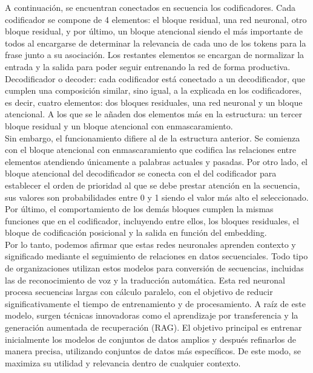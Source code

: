 A continuación, se encuentran conectados en secuencia los codificadores. Cada codificador se compone de 4 elementos: el bloque residual, una red neuronal, otro bloque residual, y por último, un bloque atencional siendo el más importante de todos al encargarse de determinar la relevancia de cada uno de los tokens para la frase junto a su asociación. Los restantes elementos se encargan de normalizar la entrada y la salida para poder seguir entrenando la red de forma productiva. \\

Decodificador o decoder: cada codificador está conectado a un decodificador, que cumplen una composición similar, sino igual,  a  la explicada en los codificadores, es decir, cuatro elementos: dos bloques residuales, una red neuronal y un bloque atencional. A los que se le añaden dos elementos más en la estructura: un tercer bloque residual y un bloque atencional con enmascaramiento. \\

Sin embargo, el funcionamiento difiere al de la estructura anterior. Se comienza con el bloque atencional con enmascaramiento que codifica las relaciones entre elementos atendiendo únicamente a palabras actuales y pasadas. Por otro lado, el bloque atencional del decodificador se conecta con el del codificador para establecer el orden de prioridad al que se debe prestar atención en la secuencia, sus valores son probabilidades entre 0 y 1 siendo el valor más alto el seleccionado. Por último, el comportamiento de los demás bloques cumplen la mismas funciones que en el codificador, incluyendo entre ellos, los bloques residuales, el bloque de codificación posicional y la salida en función del embedding.  \\

Por lo tanto, podemos afirmar que estas redes neuronales aprenden contexto y significado mediante el seguimiento de relaciones en datos secuenciales. Todo tipo de organizaciones utilizan estos modelos para conversión de secuencias, incluidas las de reconocimiento de voz y la traducción automática. Esta red neuronal procesa secuencias largas con cálculo paralelo, con el objetivo de reducir significativamente el tiempo de entrenamiento y de procesamiento.
A raíz de este modelo, surgen técnicas innovadoras como el aprendizaje por transferencia y la generación aumentada de recuperación (RAG). El objetivo principal es entrenar inicialmente los modelos de conjuntos de datos amplios y después refinarlos de manera precisa, utilizando conjuntos de datos más específicos. De este modo, se maximiza su utilidad y relevancia dentro de cualquier contexto.\\

